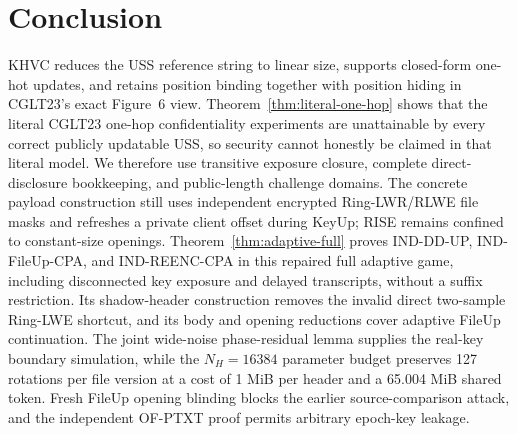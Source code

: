 \section{Conclusion}
\label{sec:conclusion}

KHVC reduces the USS reference string to linear size, supports closed-form one-hot updates, and retains position binding together with position hiding in CGLT23's exact Figure~6 view. Theorem~\ref{thm:literal-one-hop} shows that the literal CGLT23 one-hop confidentiality experiments are unattainable by every correct publicly updatable USS, so security cannot honestly be claimed in that literal model. We therefore use transitive exposure closure, complete direct-disclosure bookkeeping, and public-length challenge domains. The concrete payload construction still uses independent encrypted Ring-LWR/RLWE file masks and refreshes a private client offset during KeyUp; RISE remains confined to constant-size openings. Theorem~\ref{thm:adaptive-full} proves IND-DD-UP, IND-FileUp-CPA, and IND-REENC-CPA in this repaired full adaptive game, including disconnected key exposure and delayed transcripts, without a suffix restriction. Its shadow-header construction removes the invalid direct two-sample Ring-LWE shortcut, and its body and opening reductions cover adaptive FileUp continuation. The joint wide-noise phase-residual lemma supplies the real-key boundary simulation, while the $N_H=16384$ parameter budget preserves 127 rotations per file version at a cost of 1 MiB per header and a 65.004 MiB shared token. Fresh FileUp opening blinding blocks the earlier source-comparison attack, and the independent OF-PTXT proof permits arbitrary epoch-key leakage.

